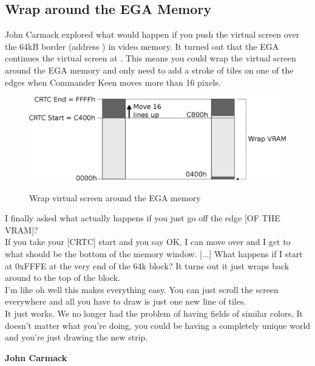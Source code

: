 \documentclass[book.tex]{subfiles}
\begin{document}
\subsection{Wrap around the EGA Memory}
\label{section:wrap_ega_memory}
\label{section:optimize_tile}
John Carmack explored what would happen if you push the virtual screen over the 64kB border (address ) in video memory. It turned out that the EGA continues the virtual screen at . This means you could wrap the virtual screen around  the EGA memory and only need to add a stroke of tiles on one of the edges when Commander Keen moves more than 16 pixels.\\
\par
\begin{figure}[H]
  \centering
  \includegraphics[width=\textwidth]{imgs/drawings/ega_wrapping.eps}
  \label{fig:ega_wrapping}
  \caption{Wrap virtual screen around the EGA memory}
\end{figure}

\par
\begin{fancyquotes}
I finally asked what actually happens if you just go off the edge [OF THE VRAM]?\\

If you take your [CRTC] start and you say OK, I can move over and I get to what should be the bottom of the memory window. [...] What happens if I start at 0xFFFE at the very end of the 64k block? It turns out it just wraps back around to the top of the block.\\

I'm like oh well this makes everything easy. You can just scroll the screen everywhere and all you have to draw is just one new line of tiles.\\

It just works. We no longer had the problem of having fields of similar colors. It doesn't matter what you're doing, you could be having a completely unique world and you're just drawing the new strip.\\
\par
\textbf{John Carmack\protect\footnotemark}
\end{fancyquotes}\\
\addtocounter{footnote}{-1}
\par
\end{document}
